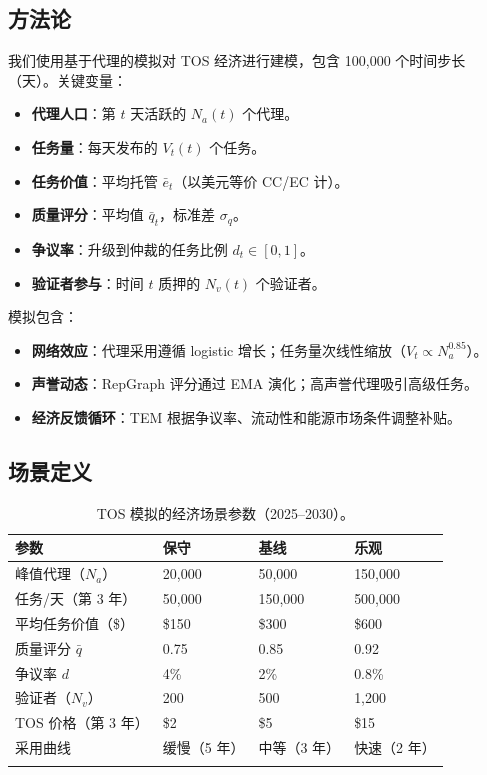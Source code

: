 \documentclass[11pt]{article}
\begin{document}
\subsection{方法论}
我们使用基于代理的模拟对 TOS 经济进行建模，包含 100,000 个时间步长（天）。关键变量：
\begin{itemize}[noitemsep]
  \item \textbf{代理人口}：第 $t$ 天活跃的 $N_a(t)$ 个代理。
  \item \textbf{任务量}：每天发布的 $V_t(t)$ 个任务。
  \item \textbf{任务价值}：平均托管 $\bar{e}_t$（以美元等价 CC/EC 计）。
  \item \textbf{质量评分}：平均值 $\bar{q}_t$，标准差 $\sigma_q$。
  \item \textbf{争议率}：升级到仲裁的任务比例 $d_t \in [0,1]$。
  \item \textbf{验证者参与}：时间 $t$ 质押的 $N_v(t)$ 个验证者。
\end{itemize}
模拟包含：
\begin{itemize}[noitemsep]
  \item \textbf{网络效应}：代理采用遵循 logistic 增长；任务量次线性缩放（$V_t \propto N_a^{0.85}$）。
  \item \textbf{声誉动态}：RepGraph 评分通过 EMA 演化；高声誉代理吸引高级任务。
  \item \textbf{经济反馈循环}：TEM 根据争议率、流动性和能源市场条件调整补贴。
\end{itemize}

\subsection{场景定义}
\begin{longtable}{@{}p{}p{}p{}p{}@{}}
\toprule
\textbf{参数} & \textbf{保守} & \textbf{基线} & \textbf{乐观} \\\midrule
峰值代理（$N_a$） & 20,000 & 50,000 & 150,000 \\
任务/天（第 3 年） & 50,000 & 150,000 & 500,000 \\
平均任务价值（\$） & \$150 & \$300 & \$600 \\
质量评分 $\bar{q}$ & 0.75 & 0.85 & 0.92 \\
争议率 $d$ & 4\% & 2\% & 0.8\% \\
验证者（$N_v$） & 200 & 500 & 1,200 \\
TOS 价格（第 3 年） & \$2 & \$5 & \$15 \\
采用曲线 & 缓慢（5 年） & 中等（3 年） & 快速（2 年） \\\bottomrule
\caption{TOS 模拟的经济场景参数（2025--2030）。}
\label{tab:econ-scenarios}
\end{longtable}
\end{document}
